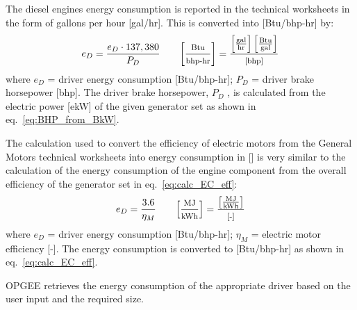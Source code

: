 \documentclass[11pt]{report}
\begin{document}
{{{{The diesel engines energy consumption is reported in the technical worksheets in the form of gallons per hour [gal/hr]. This is converted into [Btu/bhp-hr] by:
\begin{equation} \label{eq:diesel_engine_EC_unit_conversion}
e_{D} = \frac{e_{D} \cdot137,380 }{P_{D}} \quad\quad \footnotesize{\left[\frac{\text{Btu}}{\text{bhp-hr}}\right] = \frac{\left[\frac{\text{gal}}{\text{hr}}\right] \left[\frac{\text{Btu}}{\text{gal}}\right]} {\text{[bhp]}}}
\end{equation}
where $e_{D}$ = driver energy consumption [Btu/bhp-hr]; $P_{D}$ = driver brake horsepower [bhp]. The driver brake horsepower, $P_{D}$ , is calculated from the electric power [ekW] of the given generator set as shown in eq.\ \eqref{eq:BHP_from_BkW}.

The calculation used to convert the efficiency of electric motors from the General Motors technical worksheets into energy consumption in [] is very similar to the calculation of the energy consumption of the engine component from the overall efficiency of the generator set in eq.\ \eqref{eq:calc_EC_eff}:
\begin{equation} \label{eq:electric_motor_EC}
e_{D} =\frac{3.6}{\eta_{M}} \quad\quad \footnotesize{\left[\frac{\text{MJ}}{\text{kWh}}\right] = \frac{\left[\frac{\text{MJ}}{\text{kWh}}\right] }{\text{[-]}}}
\end{equation}
where $e_{D}$ = driver energy consumption [Btu/bhp-hr]; $\eta_{M}$ = electric motor efficiency [-]. The energy consumption is converted to [Btu/bhp-hr] as shown in eq.\ \eqref{eq:calc_EC_eff}.

OPGEE retrieves the energy consumption of the appropriate driver based on the user input and the required size. 


}}}}
\end{document}
